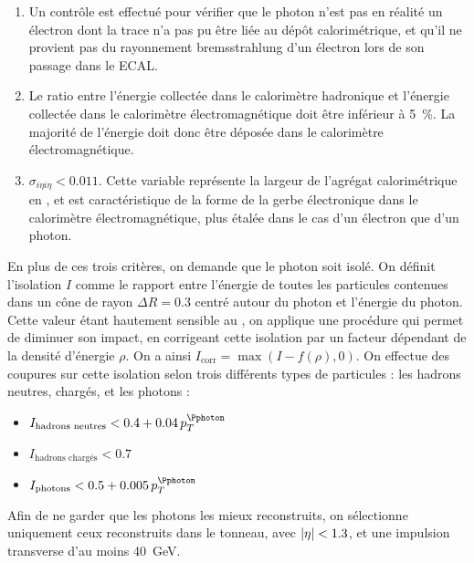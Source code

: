 \begin{enumerate}
    \item Un contrôle est effectué pour vérifier que le photon n'est pas en réalité un électron dont la trace n'a pas pu être liée au dépôt calorimétrique, et qu'il ne provient pas du rayonnement bremsstrahlung d'un électron lors de son passage dans le ECAL.
    \item Le ratio entre l'énergie collectée dans le calorimètre hadronique et l'énergie collectée dans le calorimètre électromagnétique doit être inférieur à \SI{5}{\%}. La majorité de l'énergie doit donc être déposée dans le calorimètre électromagnétique.
    \item $\sigma_{i\eta i\eta} < \num{0.011}$. Cette variable représente la largeur de l'agrégat calorimétrique en \aeta, et est caractéristique de la forme de la gerbe électronique dans le calorimètre électromagnétique, plus étalée dans le cas d'un électron que d'un photon.
\end{enumerate}

En plus de ces trois critères, on demande que le photon soit isolé. On définit l'isolation $I$ comme le rapport entre l'énergie de toutes les particules \pf contenues dans un cône de rayon $\Delta R = \num{0.3}$ centré autour du photon et l'énergie du photon. Cette valeur étant hautement sensible au \pu, on applique une procédure qui permet de diminuer son impact, en corrigeant cette isolation par un facteur dépendant de la densité d'énergie $\rho$. On a ainsi $I_\text{corr} = \max{\left(I - f(\rho), 0\right)}$. On effectue des coupures sur cette isolation selon trois différents types de particules : les hadrons neutres, chargés, et les photons :

\begin{itemize}
    \item $I_\text{hadrons neutres} < \num{0.4} + \num{0.04} \, p_T^{\Pphoton}$
    \item $I_\text{hadrons chargés} < \num{0.7}$
    \item $I_\text{photons} < \num{0.5} + \num{0.005} \, p_T^{\Pphoton}$
\end{itemize}

Afin de ne garder que les photons les mieux reconstruits, on sélectionne uniquement ceux reconstruits dans le tonneau, avec $\lvert \eta \rvert < \num{1.3}$, et une impulsion transverse d'au moins \SI{40}{\GeV}.

\medskip

